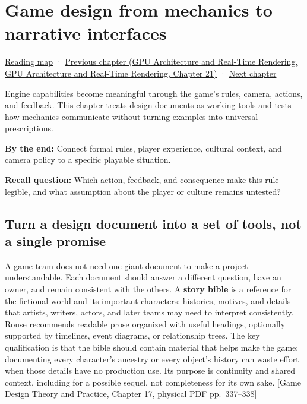 \hypertarget{06-engine-ii-ch046}{}
\chapter{Game design from mechanics to narrative interfaces}\label{stagechapter:06-engine-ii-ch046}\label{06-engine-ii-ch046-game-design-from-mechanics-to-narrative-interfaces}

\hyperref[volume-reading-map]{Reading map} · \href{../06-GPU-Architecture-and-Real-Time-Rendering/main.pdf\#nameddest=06-engine-ii-ch045-rasterizing-kernels-and-connecting-world-identity}{Previous chapter (GPU Architecture and Real-Time Rendering, GPU Architecture and Real-Time Rendering, Chapter 21)} · \hyperref[06-engine-ii-ch047-narrative-simulation-and-ai-in-playable-worlds]{Next chapter}

Engine capabilities become meaningful through the game's rules, camera, actions, and feedback. This chapter treats design documents as working tools and tests how mechanics communicate without turning examples into universal prescriptions.

\textbf{By the end:} Connect formal rules, player experience, cultural context, and camera policy to a specific playable situation.

\textbf{Recall question:} Which action, feedback, and consequence make this rule legible, and what assumption about the player or culture remains untested?

\section{Turn a design document into a set of tools, not a single promise}\label{06-engine-ii-ch046-turn-a-design-document-into-a-set-of-tools-not-a-single-promise}

A game team does not need one giant document to make a project understandable. Each document should answer a different question, have an owner, and remain consistent with the others. A \textbf{story bible} is a reference for the fictional world and its important characters: histories, motives, and details that artists, writers, actors, and later teams may need to interpret consistently. Rouse recommends readable prose organized with useful headings, optionally supported by timelines, event diagrams, or relationship trees. The key qualification is that the bible should contain material that helps make the game; documenting every character's ancestry or every object's history can waste effort when those details have no production use. Its purpose is continuity and shared context, including for a possible sequel, not completeness for its own sake. {[}Game Design Theory and Practice, Chapter 17, physical PDF pp.~337--338{]}

